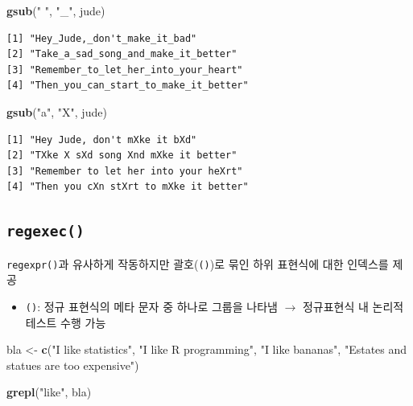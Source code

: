\documentclass[
  11pt,
]{krantz}
\newenvironment{Shaded}{\begin{snugshade}}{\end{snugshade}}
\newcommand{\KeywordTok}[1]{\textcolor[rgb]{0.27,0.27,0.27}{\textbf{#1}}}
\newcommand{\NormalTok}[1]{#1}
\newcommand{\StringTok}[1]{\textcolor[rgb]{0.5,0.5,0.5}{#1}}
\providecommand{\tightlist}{%
  \setlength{\itemsep}{0pt}\setlength{\parskip}{0pt}}
\begin{document}
\begin{Shaded}
\begin{Highlighting}[]
\KeywordTok{gsub}\NormalTok{(}\StringTok{" "}\NormalTok{, }\StringTok{"_"}\NormalTok{, jude)}
\end{Highlighting}
\end{Shaded}

\begin{verbatim}
[1] "Hey_Jude,_don't_make_it_bad"         
[2] "Take_a_sad_song_and_make_it_better"  
[3] "Remember_to_let_her_into_your_heart" 
[4] "Then_you_can_start_to_make_it_better"
\end{verbatim}

\begin{Shaded}
\begin{Highlighting}[]
\KeywordTok{gsub}\NormalTok{(}\StringTok{"a"}\NormalTok{, }\StringTok{"X"}\NormalTok{, jude)}
\end{Highlighting}
\end{Shaded}

\begin{verbatim}
[1] "Hey Jude, don't mXke it bXd"         
[2] "TXke X sXd song Xnd mXke it better"  
[3] "Remember to let her into your heXrt" 
[4] "Then you cXn stXrt to mXke it better"
\end{verbatim}

\normalsize

\hypertarget{regexec-fun}{%
\subsection{\texorpdfstring{\textbf{\texttt{regexec()}}}{regexec()}}\label{regexec-fun}}

\texttt{regexpr()}과 유사하게 작동하지만 괄호(\texttt{()})로 묶인 하위 표현식에 대한 인덱스를 제공

\begin{itemize}
\tightlist
\item
  \texttt{()}: 정규 표현식의 메타 문자 중 하나로 그룹을 나타냄 \(\rightarrow\) 정규표현식 내 논리적 테스트 수행 가능
\end{itemize}

\footnotesize

\begin{Shaded}
\begin{Highlighting}[]
\NormalTok{bla <-}\StringTok{ }\KeywordTok{c}\NormalTok{(}\StringTok{"I like statistics"}\NormalTok{, }
         \StringTok{"I like R programming"}\NormalTok{, }
         \StringTok{"I like bananas"}\NormalTok{, }
         \StringTok{"Estates and statues are too expensive"}\NormalTok{)}

\KeywordTok{grepl}\NormalTok{(}\StringTok{"like"}\NormalTok{, bla)}
\end{Highlighting}
\end{Shaded}
\end{document}
